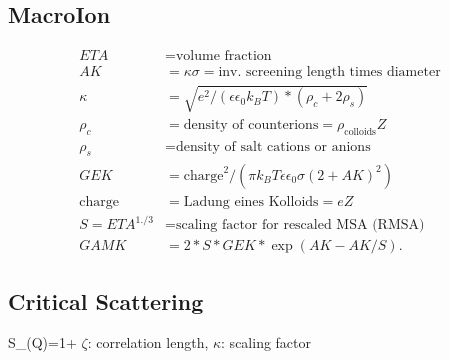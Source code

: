 
\clearpage
\subsection{MacroIon}

\begin{subequations}
\begin{align}
ETA &= \text{volume fraction} \\
AK &= \kappa \sigma = \text{inv. screening length times diameter} \\
\kappa &=\sqrt{ e^2/(\epsilon \epsilon_0 k_B T)*(\rho_c+2 \rho_s) }\\
\rho_c &= \text{density of counterions} = \rho_\text{colloids} Z \\
\rho_s &= \text{density of salt cations or anions} \\
GEK &=\text{charge}^2/( \pi k_B T \epsilon \epsilon_0 \sigma (2+AK)^2)\\
\text{charge} &= \text{Ladung eines Kolloids} = e Z\\
S=ETA^{1./3} &= \text{scaling factor for rescaled MSA (RMSA)}\\
GAMK&=2*S*GEK*\exp(AK-AK/S).
\end{align}
\end{subequations}


\clearpage
\subsection{Critical Scattering}

\BE S_(Q)=1+ \EE $\zeta$:
correlation length, $\kappa$: scaling factor






